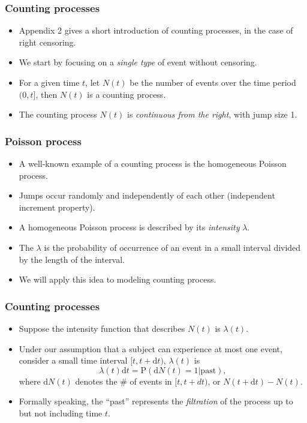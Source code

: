 \documentclass[10pt]{beamer}\usepackage[]{graphicx}\usepackage[]{color}
\newcommand{\dif}{\mathrm{d}}
\newcommand{\dt}{\mathrm{d}t}
\newcommand{\p}{\mathrm{P}}
\begin{document}
\begin{frame}
  \frametitle{Counting processes}
  \begin{itemize}  
  \item Appendix 2 gives a short introduction of counting processes, in the case of right censoring. 
  \item We start by focusing on a \emph{single type} of event without censoring.
  \item For a given time $t$, let $N(t)$ be the number of events over the time period $(0, t]$, 
    then $N(t)$ is a counting process.
  \item The counting process $N(t)$ is \emph{continuous from the right}, with jump size 1.
  \end{itemize}    
\end{frame}


\begin{frame}
  \frametitle{Poisson process}
  \begin{itemize}  
  \item A well-known example of a counting process is the homogeneous Poisson process.
  \item Jumps occur randomly and independently of each other (independent increment property).
  \item A homogeneous Poisson process is described by its \emph{intensity} $\lambda$.
  \item The $\lambda$ is the probability of occurrence of an event in a small interval divided by the length of the interval.
  \item We will apply this idea to modeling counting process.
  \end{itemize}    
\end{frame}

\begin{frame}
  \frametitle{Counting processes}
  \begin{itemize}  
  \item Suppose the intensity function that describes $N(t)$ is $\lambda(t)$.
  \item Under our assumption that a subject can experience at most one event, 
    consider a small time interval $[t, t + \dt)$,
    $\lambda(t)$ is
    \begin{equation*}
      \lambda(t) \dt = \p(\dif N(t) = 1|\mbox{past}),
    \end{equation*}
    where $\dif N(t)$ denotes the \# of events in $[t, t + dt)$, or $N(t + \dt) - N(t)$.
  \item Formally speaking, the ``past'' represents the \emph{filtration} of the process up to but not including time $t$.
  \end{itemize}    
\end{frame}
\end{document}
